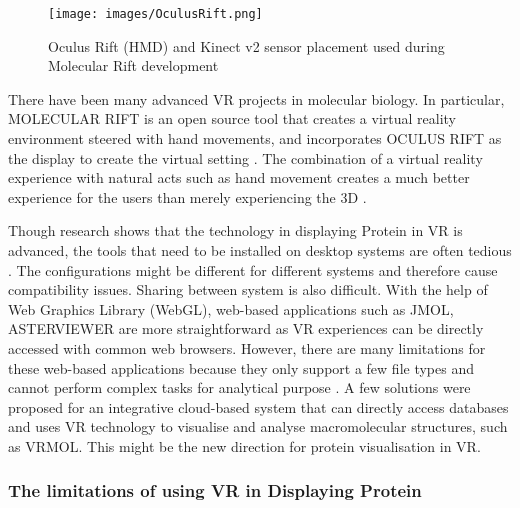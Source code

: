 \begin{figure}[!htp]
	\centering
	\texttt{[image: images/OculusRift.png]}
	\caption{Oculus Rift (HMD) and Kinect v2 sensor placement used during Molecular Rift development}
	\label{fig:OculusRift}
\end{figure}


There have been many advanced VR projects in molecular biology. In particular,  {\footnotesize MOLECULAR RIFT} is an open source tool that creates a virtual reality environment steered with hand movements, and incorporates {\footnotesize OCULUS RIFT} as the display to create the virtual setting \parencite{norrby_molecular_2015}. The combination of a virtual reality experience with natural acts such as hand movement creates a much better experience for the users than merely experiencing the 3D \parencite{norrby_molecular_2015}.

Though research shows that the technology in displaying Protein in VR is advanced, the tools that need to be installed on desktop systems are often tedious \parencite{xu_vrmol_2019}. The configurations might be different for different systems and therefore cause compatibility issues. Sharing between system is also difficult. With the help of Web Graphics Library (WebGL), web-based applications such as {\footnotesize JMOL}, {\footnotesize ASTERVIEWER} are more straightforward as VR experiences can be directly accessed with common web browsers. However, there are many limitations for these web-based applications because they only support a few file types and cannot perform complex tasks for analytical purpose \parencite{xu_vrmol_2019}. A few solutions were proposed for an integrative cloud-based system that can directly access databases and uses VR technology to visualise and analyse macromolecular structures, such as {\footnotesize VRMOL}. This might be the new direction for protein visualisation in VR.

\subsubsection{The limitations of using VR in Displaying Protein}

